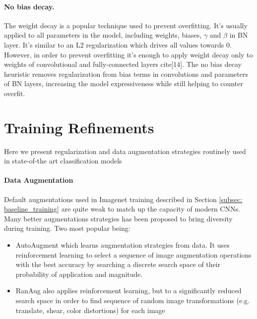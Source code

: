 \paragraph{No bias decay.}
The weight decay is a popular technique used to prevent overfitting. It's usually applied to all parameters in the model, including weights, biases, $\gamma$ and $\beta$ in BN layer. It's similar to an L2 regularization which drives all values towards $0$. However, in order to prevent overfitting it's enough to apply weight decay only to weights of convolutional and fully-connected layers cite[14]. The no bias decay heuristic removes regularization from bias terms in convolutions and parameters of BN layers, increasing the model expressiveness while still helping to counter overfit.  


\section{Training Refinements}

Here we present regularization and data augmentation strategies routinely used in state-of-the art classification models \cite{lin2020neural_genet} \cite{tan2019_efficientnet} \cite{tan2021_efficientnetv2}

\paragraph{Data Augmentation}
Default augmentations used in Imagenet training described in Section \ref{subsec: baseline_training} are quite weak to match up the capacity of modern CNNs. Many better augmentations strategies has been proposed to bring diversity during training. Two most popular being: 

\begin{itemize}
    \item AutoAugment \cite{cubuk2018_autoaugment} which learns augmentation strategies from data. It uses reinforcement learning to select a sequence of image augmentation operations with the best accuracy by searching a discrete search space of their probability of application and magnitude.
    \item RanAug \cite{cubuk2020_randaugment} also applies reinforcement learning, but to a significantly reduced search space in order to find sequence of random image transformations (e.g. translate, shear, color distortions) for each image
\end{itemize}

